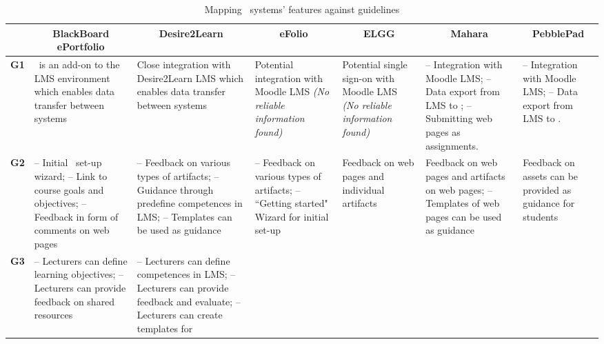 \begin{sidewaystable} \scriptsize
\centering
	\caption{Mapping \ep~systems' features against \LLLs guidelines}
	\begin{tabular}{|c|p{3.25cm}|p{3.25cm}|p{3.25cm}|p{3.25cm}|p{3.25cm}|p{3.25cm}|}
	\hline
	 \multicolumn{1}{|c|}{} &
     \multicolumn{1}{c|}{\textbf{BlackBoard ePortfolio}} & 
     \multicolumn{1}{c|}{\textbf{Desire2Learn}} & 
     \multicolumn{1}{c|}{\textbf{eFolio}} & 
     \multicolumn{1}{c|}{\textbf{ELGG}} & 
     \multicolumn{1}{c|}{\textbf{Mahara}} & 
     \multicolumn{1}{c|}{\textbf{PebblePad}} \\ \hline
	\textbf{G1} & 
	\ep~is an add-on to the LMS environment which enables data transfer between
	systems & 
	Close integration with Desire2Learn LMS which enables data transfer between
	systems & 
	Potential integration with Moodle LMS \textit{(No reliable information found)}
	& Potential single sign-on with Moodle LMS \textit{(No reliable information
	found)} & 
	-- Integration with Moodle LMS; \newline -- Data export from LMS to
	\ep; \newline -- Submitting web pages as assignments. &
	-- Integration with Moodle LMS; \newline -- Data export from LMS to
	\ep. \\ \hline 
	\textbf{G2} & 
	-- Initial \ep~set-up wizard; \newline -- Link to course goals and objectives;
	\newline -- Feedback in form of comments on web pages & 
	-- Feedback on various types of artifacts; \newline -- Guidance through
	predefine competences in LMS; \newline -- Templates can be used as guidance &  
	-- Feedback on various types of artifacts; \newline -- ``Getting started"
	Wizard for initial set-up & 
	Feedback on web pages and individual artifacts & 
	Feedback on web pages and artifacts on web pages; \newline -- Templates of web
	pages can be used as guidance & 
	Feedback on assets can be provided as guidance for students \\ \hline 
	\textbf{G3} & 
	-- Lecturers can define learning objectives; \newline -- Lecturers can provide
	feedback on shared resources & 
	-- Lecturers can define competences in LMS; \newline -- Lecturers can
	provide feedback and evaluate; \newline -- Lecturers can create templates for

\end{tabular}
\end{sidewaystable}
